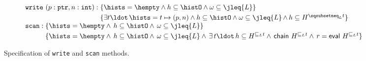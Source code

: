 \begin{figure}
%
\centering
\[
\begin{array}{l}
\mathtt{write}\ (p : \mathtt{ptr}, n : \mathtt{int}) : 
\!\!\!\begin{array}[t]{l}
\{\hists = \hempty \wedge h \subseteq \histO
           \wedge \omega \subseteq \jleq{\ordlist}\}\\[3pt]
\{\exists t\ldot\, \hists = t \mapsto (p, n) \wedge h \subseteq \histO \wedge
  \omega \subseteq \jleq{\ordlist}\,{\wedge}\,
   h \subseteq H^{\hbox{}\sqsubsetneq_\ordlist t}\}
\end{array}\\
%
\mathtt{scan} : 
\!\!\!\begin{array}[t]{l}
\{\hists = \hempty \wedge\, h \subseteq \histO \wedge\,
          \omega \subseteq \jleq{\ordlist}\}\\[3pt]
          \{\hists = \hempty \wedge\, h \subseteq \histO \wedge\,
            \omega \subseteq \jleq{\ordlist} \wedge\, \exists\, t\ldot\, %
             h \subseteq H^{\hbox{}\sqsubseteq_\ordlist t} \wedge\,
             \mathsf{chain}\ H^{\hbox{}\sqsubseteq_\ordlist t} \wedge\,
             r = \mathsf{eval}\ {H^{\hbox{}\sqsubseteq_\ordlist t}}\}
       \end{array}
\end{array}
\]
\caption{\label{fig:specs} Specification of {\tt write} and {\tt scan}
  methods.}
\end{figure}
